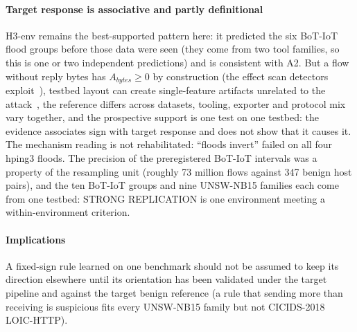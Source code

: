 \documentclass[preprint,12pt]{elsarticle}
\begin{document}
\paragraph{Target response is associative and partly definitional} H3-env remains the best-supported pattern here: it predicted the six BoT-IoT flood groups before those data were seen (they come from two tool families, so this is one or two independent predictions) and is consistent with A2. But a flow without reply bytes has $A_{bytes}\ge0$ by construction (the effect scan detectors exploit~\cite{jung2004portscan}), testbed layout can create single-feature artifacts unrelated to the attack~\cite{flood2024smells}, the reference differs across datasets, tooling, exporter and protocol mix vary together, and the prospective support is one test on one testbed: the evidence associates sign with target response and does not show that it causes it. The mechanism reading is not rehabilitated: ``floods invert'' failed on all four hping3 floods. The precision of the preregistered BoT-IoT intervals was a property of the resampling unit (roughly 73 million flows against 347 benign host pairs), and the ten BoT-IoT groups and nine UNSW-NB15 families each come from one testbed: STRONG REPLICATION is one environment meeting a within-environment criterion.

\paragraph{Implications} A fixed-sign rule learned on one benchmark should not be assumed to keep its direction elsewhere until its orientation has been validated under the target pipeline and against the target benign reference (a rule that sending more than receiving is suspicious fits every UNSW-NB15 family but not CICIDS-2018 LOIC-HTTP).
\end{document}
